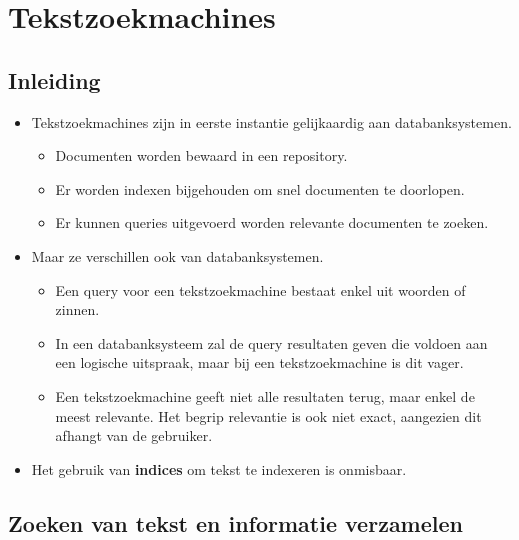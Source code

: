 \section{Tekstzoekmachines}
\subsection{Inleiding}
\begin{itemize}
    \item Tekstzoekmachines zijn in eerste instantie gelijkaardig aan databanksystemen.
    \begin{itemize}
        \item Documenten worden bewaard in een repository.
        \item Er worden indexen bijgehouden om snel documenten te doorlopen.
        \item Er kunnen queries uitgevoerd worden relevante documenten te zoeken.
    \end{itemize}
    \item Maar ze verschillen ook van databanksystemen.
    \begin{itemize}
        \item Een query voor een tekstzoekmachine bestaat enkel uit woorden of zinnen.
        \item In een databanksysteem zal de query resultaten geven die voldoen aan een logische uitspraak, maar bij een tekstzoekmachine is dit vager.
        \item Een tekstzoekmachine geeft niet alle resultaten terug, maar enkel de meest relevante. Het begrip relevantie is ook niet exact, aangezien dit afhangt van de gebruiker.
    \end{itemize}
    \item Het gebruik van \textbf{indices} om tekst te indexeren is onmisbaar.
\end{itemize}

\subsection{Zoeken van tekst en informatie verzamelen}

